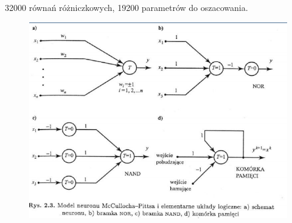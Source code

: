 32000 równań różniczkowych, 19200 parametrów do oszacowania.

\begin{figure}[H]
 \centering
 \includegraphics[scale=0.6]{sieci1}
\end{figure}